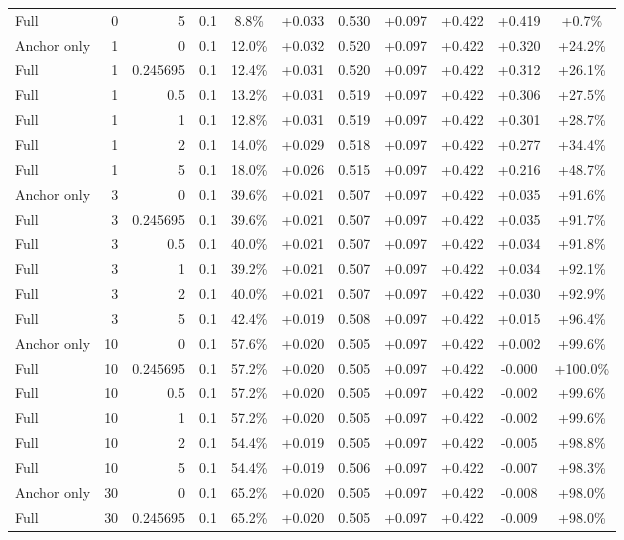 \begin{table}[htbp]
\begin{tabular}{lrrrccccccc}
Full & 0 & 5 & 0.1 & 8.8\% & +0.033 & 0.530 & +0.097 & +0.422 & +0.419 & +0.7\% \\
Anchor only & 1 & 0 & 0.1 & 12.0\% & +0.032 & 0.520 & +0.097 & +0.422 & +0.320 & +24.2\% \\
Full & 1 & 0.245695 & 0.1 & 12.4\% & +0.031 & 0.520 & +0.097 & +0.422 & +0.312 & +26.1\% \\
Full & 1 & 0.5 & 0.1 & 13.2\% & +0.031 & 0.519 & +0.097 & +0.422 & +0.306 & +27.5\% \\
Full & 1 & 1 & 0.1 & 12.8\% & +0.031 & 0.519 & +0.097 & +0.422 & +0.301 & +28.7\% \\
Full & 1 & 2 & 0.1 & 14.0\% & +0.029 & 0.518 & +0.097 & +0.422 & +0.277 & +34.4\% \\
Full & 1 & 5 & 0.1 & 18.0\% & +0.026 & 0.515 & +0.097 & +0.422 & +0.216 & +48.7\% \\
Anchor only & 3 & 0 & 0.1 & 39.6\% & +0.021 & 0.507 & +0.097 & +0.422 & +0.035 & +91.6\% \\
Full & 3 & 0.245695 & 0.1 & 39.6\% & +0.021 & 0.507 & +0.097 & +0.422 & +0.035 & +91.7\% \\
Full & 3 & 0.5 & 0.1 & 40.0\% & +0.021 & 0.507 & +0.097 & +0.422 & +0.034 & +91.8\% \\
Full & 3 & 1 & 0.1 & 39.2\% & +0.021 & 0.507 & +0.097 & +0.422 & +0.034 & +92.1\% \\
Full & 3 & 2 & 0.1 & 40.0\% & +0.021 & 0.507 & +0.097 & +0.422 & +0.030 & +92.9\% \\
Full & 3 & 5 & 0.1 & 42.4\% & +0.019 & 0.508 & +0.097 & +0.422 & +0.015 & +96.4\% \\
Anchor only & 10 & 0 & 0.1 & 57.6\% & +0.020 & 0.505 & +0.097 & +0.422 & +0.002 & +99.6\% \\
Full & 10 & 0.245695 & 0.1 & 57.2\% & +0.020 & 0.505 & +0.097 & +0.422 & -0.000 & +100.0\% \\
Full & 10 & 0.5 & 0.1 & 57.2\% & +0.020 & 0.505 & +0.097 & +0.422 & -0.002 & +99.6\% \\
Full & 10 & 1 & 0.1 & 57.2\% & +0.020 & 0.505 & +0.097 & +0.422 & -0.002 & +99.6\% \\
Full & 10 & 2 & 0.1 & 54.4\% & +0.019 & 0.505 & +0.097 & +0.422 & -0.005 & +98.8\% \\
Full & 10 & 5 & 0.1 & 54.4\% & +0.019 & 0.506 & +0.097 & +0.422 & -0.007 & +98.3\% \\
Anchor only & 30 & 0 & 0.1 & 65.2\% & +0.020 & 0.505 & +0.097 & +0.422 & -0.008 & +98.0\% \\
Full & 30 & 0.245695 & 0.1 & 65.2\% & +0.020 & 0.505 & +0.097 & +0.422 & -0.009 & +98.0\% \\

\end{tabular}
\end{table}
